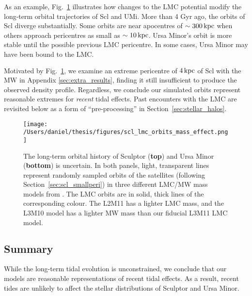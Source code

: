 As an example, Fig.~\ref{fig:scl_orbit_lmc_uncert} illustrates how
changes to the LMC potential modify the long-term orbital trajectories
of Scl and UMi. More than 4 Gyr ago, the orbits of Scl diverge
substantially. Some orbits are near apocentres of \(\sim 300\,{\rm kpc}\)
when others approach pericentres as small as \(\sim 10\,{\rm kpc}\). Ursa
Minor's orbit is more stable until the possible previous LMC pericentre.
In some cases, Ursa Minor may have been bound to the LMC.

Motivated by Fig.~\ref{fig:scl_orbit_lmc_uncert}, we examine an extreme
pericentre of \(4\,{\rm kpc}\) of Scl with the MW in Appendix
\ref{sec:extra_results}, finding it still insufficient to produce the
observed density profile. Regardless, we conclude our simulated orbits
represent reasonable extremes for \emph{recent} tidal effects. Past
encounters with the LMC are revisited below as a form of
``pre-processing'' in Section~\ref{sec:stellar_halos}.

\begin{figure}
\centering
\texttt{[image: /Users/daniel/thesis/figures/scl\_lmc\_orbits\_mass\_effect.png]}
\caption[Long term orbital uncertainties]{The long-term orbital history
of Sculptor (\textbf{top}) and Ursa Minor (\textbf{bottom}) is
uncertain. In both panels, light, transparent lines represent randomly
sampled orbits of the satellites (following
Section~\ref{sec:scl_smallperi}) in three different LMC/MW mass models
from \citet{vasiliev2024}. The LMC orbits are in solid, thick lines of
the corresponding colour. The L2M11 has a lighter LMC mass, and the
L3M10 model has a lighter MW mass than our fiducial L3M11 LMC
model.}\label{fig:scl_orbit_lmc_uncert}
\end{figure}

\subsection{Summary}\label{summary-2}

While the long-term tidal evolution is unconstrained, we conclude that
our models are reasonable representations of recent tidal effects. As a
result, recent tides are unlikely to affect the stellar distributions of
Sculptor and Ursa Minor.
